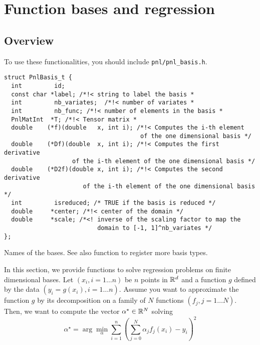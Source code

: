 \section{Function bases and regression}
\subsection{Overview}

To use these functionalities, you should include \verb!pnl/pnl_basis.h!.

\begin{verbatim}
struct PnlBasis_t {
  int         id;
  const char *label; /*!< string to label the basis *
  int         nb_variates;  /*!< number of variates *
  int         nb_func; /*!< number of elements in the basis *
  PnlMatInt  *T; /*!< Tensor matrix *
  double    (*f)(double   x, int i); /*!< Computes the i-th element
                                      of the one dimensional basis */
  double    (*Df)(double  x, int i); /*!< Computes the first derivative
                   of the i-th element of the one dimensional basis */
  double    (*D2f)(double x, int i); /*!< Computes the second derivative
                      of the i-th element of the one dimensional basis */
  int         isreduced; /* TRUE if the basis is reduced */
  double     *center; /*!< center of the domain */
  double     *scale; /*<! inverse of the scaling factor to map the 
                          domain to [-1, 1]^nb_variates */
};
\end{verbatim}

\begin{table}[h!]
  \begin{describeconst}
  \end{describeconst}
  \caption{Names of the bases. See also function
   to register more basis types.}
  \label{basis_index}
\end{table}

In this section, we provide functions to solve regression problems on
finite dimensional bases. Let $(x_i, i=1 \dots n)$ be $n$ points in ${\mathbb R}^d$ and a
function $g$ defined by the data $(y_i = g(x_i), i=1 \dots n)$. Assume you
want to approximate the function $g$ by its decomposition on a family of $N$
functions $(f_j, j=1\dots N)$. Then, we want to compute the vector
$\alpha^\star \in {\mathbb R}^N$ solving
\begin{equation*} \alpha^\star = \arg\min_\alpha \sum_{i=1}^{n}
  \left(\sum_{j=0}^N \alpha_j f_j(x_i) - y_i\right)^2
\end{equation*}

